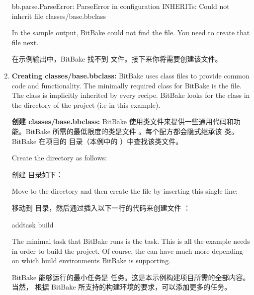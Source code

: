 \begin{enumerate}
\begin{pyglist}
bb.parse.ParseError: ParseError in configuration INHERITs: Could not inherit file classes/base.bbclass
\end{pyglist}

\medskip
In the sample output, BitBake could not find the  file. You need to create that file next.

\medskip
在示例输出中，BitBake 找不到  文件。接下来你将需要创建该文件。

\item \textbf{Creating classes/base.bbclass:} BitBake uses class files to provide common code and functionality. The minimally required class for BitBake is the  file. The  class is implicitly inherited by every recipe. BitBake looks for the class in the  directory of the project (i.e  in this example).

\medskip
\textbf{创建 classes/base.bbclass:} BitBake 使用类文件来提供一些通用代码和功能。BitBake 所需的最低限度的类是文件 。每个配方都会隐式继承该  类。BitBake 在项目的  目录（本例中的 ）中查找该类文件。

\medskip
Create the  directory as follows:

\medskip
创建  目录如下：

\medskip
{}

\medskip
Move to the  directory and then create the  file by inserting this single line:

\medskip
移动到  目录，然后通过插入以下一行的代码来创建文件 ：

\medskip
\begin{pyglist}
addtask build
\end{pyglist}

\medskip
The minimal task that BitBake runs is the  task. This is all the example needs in order to build the project. Of course, the  can have much more depending on which build environments BitBake is supporting.

\medskip
BitBake 能够运行的最小任务是  任务。这是本示例构建项目所需的全部内容。当然， 根据 BitBake 所支持的构建环境的要求，可以添加更多的任务。


\end{enumerate}

